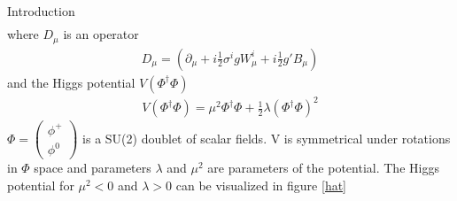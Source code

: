 \begin{chapter}{Introduction}
\begin{align}
\end{align}
where $D_\mu$ is an operator 
 \begin{align}
D_\mu = \left(\partial_\mu+i\frac{1}{2}\sigma^igW^i_\mu+i\frac{1}{2} g' B_\mu \right) 
 \end{align}
 and the Higgs potential $V(\Phi^\dagger \Phi)$
\begin{align}
 V(\Phi^\dagger \Phi)=\mu^2 \Phi^\dagger \Phi +\frac{1}{2} \lambda (\Phi^\dagger \Phi)^2   
\end{align}
 $\Phi=\left(\begin{array}{c}
 \phi^+ \\
\phi^0
\end{array} \right) $ is a SU(2) doublet of scalar fields. V is symmetrical under rotations in $\Phi$ space
and parameters $\lambda $ and $\mu^2$ are parameters of the potential. The Higgs potential for $\mu^2 <0$ and $\lambda>0$ can be visualized in figure \ref{hat}


\end{chapter}
